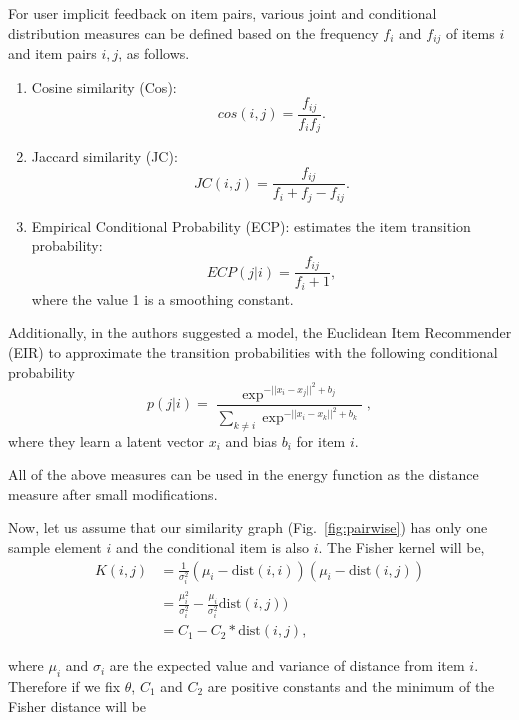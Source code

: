 \documentclass[preprint]{sig-alternate-05-2015}
\begin{document}
For user implicit feedback on item pairs, various joint and conditional distribution measures can be defined based on the frequency $f_i$ and $f_{ij}$ of items $i$ and item pairs $i,j$, as follows.
%
\begin{enumerate}
%
\item Cosine similarity (Cos):
%
\begin{equation}
cos(i,j) = \frac{f_{ij}}{f_i f_j}.
\nonumber
\end{equation}
%
\item Jaccard similarity (JC):
%
\begin{equation}
JC(i,j) = \frac{f_{ij}}{f_i+f_j-f_{ij}}.
\nonumber
\end{equation}
%
\item Empirical Conditional Probability (ECP): estimates the item transition probability:
%
\begin{equation}
ECP(j|i) = \frac{f_{ij}}{f_i+1},
\nonumber 
\end{equation}
%
where the value 1 is a smoothing constant. 
\end{enumerate}
%
Additionally, in \cite{koenigstein2013towards} the authors suggested a model, the Euclidean Item Recommender (EIR) to approximate the transition probabilities with the following conditional probability
%
\begin{equation}
p(j | i) = \frac{\exp^{-||x_i-x_j||^2 + b_j}}{\sum_{k \neq i} \exp^{-||x_i-x_k||^2+b_k}},
\nonumber
\end{equation}
%
where they learn a latent vector $x_i$ and bias $b_i$ for item $i$. 

All of the above measures can be used in the energy function as the distance measure after small modifications. 

Now, let us assume that our similarity graph (Fig.~\ref{fig:pairwise}) has only one sample element $i$ and the conditional item is also $i$. The Fisher kernel will be,
%
\begin{equation}
\nonumber
\begin{split}
K(i,j) &= \frac{1}{\sigma_{i}^2} (\mu_i - \mbox{dist}(i,i))(\mu_i-\mbox{dist}(i,j)) \\
       &= \frac{\mu_i^2}{\sigma_{i}^2} - \frac{\mu_i}{\sigma_{i}^2} \mbox{dist}(i,j)) \\
       &= C_1-C_2*\mbox{dist}(i,j),
\end{split}
\end{equation}

where $\mu_i$ and $\sigma_i$ are the expected value and variance of distance from item $i$. Therefore if we fix $\theta$, $C_1$ and $C_2$ are positive constants and the minimum of the 
Fisher distance will be %
\end{document}

